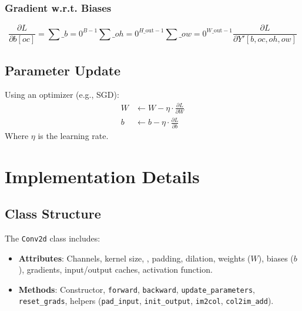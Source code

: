 \documentclass{article}
\begin{document}
\subsubsection{Gradient w.r.t. Biases}
\begin{equation}
\frac{\partial L}{\partial b[oc]} = \sum\_{b=0}^{B-1} \sum\_{oh=0}^{H\_{\text{out}}-1} \sum\_{ow=0}^{W\_{\text{out}}-1} \frac{\partial L}{\partial Y'[b, oc, oh, ow]}
\end{equation}

\subsection{Parameter Update}
Using an optimizer (e.g., SGD):
\begin{align}
W &\gets W - \eta \cdot \frac{\partial L}{\partial W} \\
b &\gets b - \eta \cdot \frac{\partial L}{\partial b}
\end{align}
Where $\eta$ is the learning rate.

\section{Implementation Details}

\subsection{Class Structure}
The \texttt{Conv2d} class includes:
\begin{itemize}
    \item \textbf{Attributes}: Channels, kernel size, , padding, dilation, weights ($W$), biases ($b$), gradients, input/output caches, activation function.
    \item \textbf{Methods}: Constructor, \texttt{forward}, \texttt{backward}, \texttt{update\_parameters}, \texttt{reset\_grads}, helpers (\texttt{pad\_input}, \texttt{init\_output}, \texttt{im2col}, \texttt{col2im\_add}).
\end{itemize}
\end{document}
